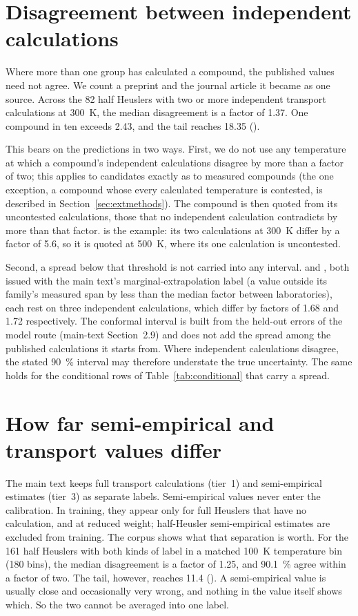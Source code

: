\documentclass[preprint, 12pt]{elsarticle}
\begin{document}
\section{Disagreement between independent calculations}
\label{sec:spread}

Where more than one group has calculated a compound, the published values need not agree. We count a
preprint and the journal article it became as one source. Across the \num{82} half Heuslers with two
or more independent transport calculations at \SI{300}{\kelvin}, the median disagreement is a factor
of \num{1.37}. One compound in ten exceeds \num{2.43}, and the tail reaches \num{18.35}
().

This bears on the predictions in two ways. First, we do not use any temperature at which a
compound's independent calculations disagree by more than a factor of two; this applies to
candidates exactly as to measured compounds (the one exception, a compound whose every calculated
temperature is contested, is described in Section~\ref{sec:extmethods}). The compound is then quoted from its uncontested
calculations, those that no independent calculation contradicts by more than that factor.
 is the example: its two calculations at \SI{300}{\kelvin} differ by a factor of
\num{5.6}, so it is quoted at \SI{500}{\kelvin}, where its one calculation is uncontested.

Second, a spread below that threshold is not carried into any interval.  and
, both issued with the main text's marginal-extrapolation label (a value outside its
family's measured span by less than the median factor between laboratories), each rest on three
independent calculations, which differ by factors of \num{1.68} and \num{1.72} respectively. The
conformal interval is built from the held-out errors of the model route (main-text
Section~2.9) and does not add the spread among the published calculations it starts from. Where
independent calculations disagree, the stated \SI{90}{\percent} interval may therefore understate the
true uncertainty. The same holds for the conditional rows
of Table~\ref{tab:conditional} that carry a spread.

\section{How far semi-empirical and transport values differ}
\label{sec:tiergap}

The main text keeps full transport calculations (tier~1) and semi-empirical estimates (tier~3) as
separate labels. Semi-empirical values never enter the calibration. In training, they appear only
for full Heuslers that have no calculation, and at reduced weight; half-Heusler semi-empirical
estimates are excluded from training. The corpus shows what that separation is worth. For the
\num{161} half Heuslers with both kinds of label in a matched \SI{100}{\kelvin} temperature bin
(\num{180} bins), the median disagreement is a factor of \num{1.25}, and \SI{90.1}{\percent} agree
within a factor of two. The tail, however, reaches \num{11.4} (). A semi-empirical value
is usually close and occasionally very wrong, and nothing in the value itself shows which. So the
two cannot be averaged into one label.
\end{document}
